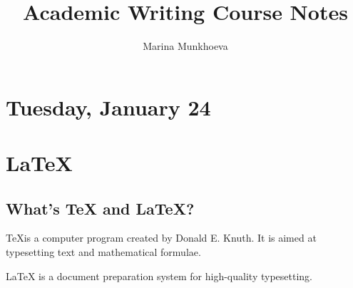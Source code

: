 \documentclass[a4paper, 12pt]{article}
\author{Marina Munkhoeva}
\date{}
\title{Academic Writing Course Notes}
\begin{document}
	\maketitle
	\section*{Tuesday, January 24}
	
	\section{\LaTeX}
	\subsection{What's \TeX{} and \LaTeX{}?}
	\TeX is a computer program created by Donald E. Knuth. It is aimed at typesetting text and mathematical formulae. 
	
	\noindent
	\LaTeX{} is a document preparation system for high-quality typesetting. 
	

	
\end{document}
